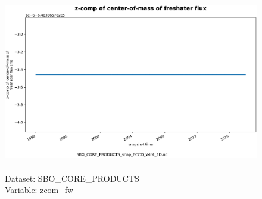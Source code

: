 \begin{figure}[H]
\centering
\includegraphics[scale=0.5]{../images/plots/oneD_plots/SBO_Core_Products/zcom_fw.png}
\caption{\\Dataset: SBO\_CORE\_PRODUCTS\\Variable: zcom\_fw}
\label{tab:table-SBO_CORE_PRODUCTS_zcom_fw-Plot}
\end{figure}
\pagebreak

